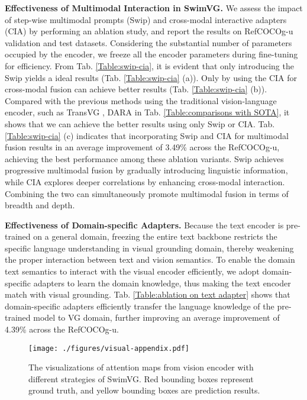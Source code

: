 \noindent
\textbf{Effectiveness of Multimodal Interaction in SwimVG.} We assess the impact of step-wise multimodal prompts (Swip) and cross-modal interactive adapters (CIA) by performing an ablation study, and report the results on RefCOCOg-u validation and test datasets. Considering the substantial number of parameters occupied by the encoder, we freeze all the encoder parameters during fine-tuning for efficiency. From Tab. \ref{Table:swip-cia}, it is evident that only introducing the Swip yields a ideal results (Tab. \ref{Table:swip-cia} (a)). Only by using the CIA for cross-modal fusion can achieve better results (Tab. \ref{Table:swip-cia} (b)). Compared with the previous methods using the traditional vision-language encoder, such as TransVG \cite{deng2021transvg}, DARA \cite{liu2024dara} in Tab. \ref{Table:comparisons with SOTA}, it shows that we can achieve the better results using only Swip or CIA. Tab. \ref{Table:swip-cia} (c) indicates that incorporating Swip and CIA for multimodal fusion results in an average improvement of 3.49\% across the RefCOCOg-u, achieving the best performance among these ablation variants. Swip achieves progressive multimodal fusion by gradually introducing linguistic information, while CIA explores deeper correlations by enhancing cross-modal interaction. Combining the two can simultaneously promote multimodal fusion in terms of breadth and depth.





\noindent
\textbf{Effectiveness of Domain-specific Adapters.} Because the text encoder is pre-trained on a general domain, freezing the entire text backbone restricts the specific language understanding in visual grounding domain, thereby weakening the proper interaction between text and vision semantics. To enable the domain text semantics to interact with the visual encoder efficiently, we adopt domain-specific adapters to learn the domain knowledge, thus making the text encoder match with visual grounding. Tab. \ref{Table:ablation on text adapter} shows that domain-specific adapters efficiently transfer the language knowledge of the pre-trained model to VG domain, further improving an average improvement of 4.39\% across the RefCOCOg-u.






\begin{figure*}[t]
\centering
\texttt{[image: ./figures/visual-appendix.pdf]}
\caption{The visualizations of attention maps from vision encoder with different strategies of SwimVG. Red bounding boxes represent ground truth, and yellow bounding boxes are prediction results.}
\vspace{-4mm}
\label{fig:more visualizations}
\end{figure*}


